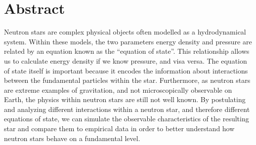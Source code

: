 \section*{Abstract}

Neutron stars are complex physical objects often modelled as a hydrodynamical system. Within these models, the two parameters energy density and pressure are related by an equation known as the ``equation of state''. This relationship allows us to calculate energy density if we know pressure, and visa versa. The equation of state itself is important because it encodes the information about interactions between the fundamental particles within the star. Furthermore, as neutron stars are extreme examples of gravitation, and not microscopically observable on Earth, the physics within neutron stars are still not well known. By postulating and analyzing different interactions within a neutron star, and therefore different equations of state, we can simulate the observable characteristics of the resulting star and compare them to empirical data in order to better understand how neutron stars behave on a fundamental level.